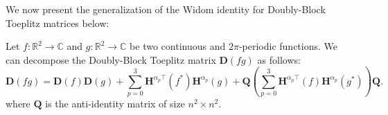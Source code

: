 We now present the generalization of the Widom identity for Doubly-Block Toeplitz matrices below:
\begin{lemma} \label{appendix-th:widom_idenity} Let $f:\mathbb{R}^2 \rightarrow \mathbb{C}$ and $g:\mathbb{R}^2 \rightarrow \mathbb{C}$ be two continuous and $2\pi$-periodic functions. 
We can decompose the Doubly-Block Toeplitz matrix $\mathbf{D}(fg)$ as follows:
\begin{equation}
    \mathbf{D}(fg) = \mathbf{D}(f)\mathbf{D}(g) + \sum_{p=0}^3 \mathbf{H}^{\alpha_p \top}(f^*) \mathbf{H}^{\alpha_p}(g) + \mathbf{Q} \left( \sum_{p=0}^3 \mathbf{H}^{\alpha_p \top}(f) \mathbf{H}^{\alpha_p }(g^*) \right) \mathbf{Q}.
\end{equation}
where $\mathbf{Q}$ is the anti-identity matrix of size $n^2 \times n^2$.
\end{lemma}
